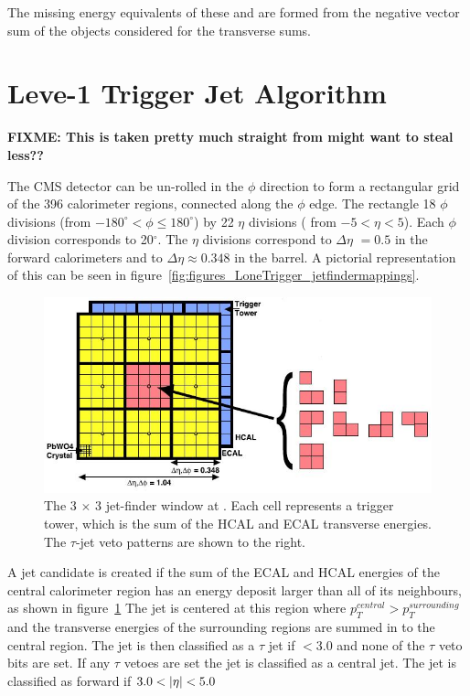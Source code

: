 The missing energy equivalents of these \MET and \MHT are formed from the 
negative vector sum of the objects considered for the
transverse sums.



\section{Leve-1 Trigger Jet Algorithm} %
\label{sec:leve_1_trigger_jet_algorithm}

\textbf{FIXME: This is taken pretty much straight from \cite{gctcomm} might 
want to steal less??} 

The CMS detector can be un-rolled in the $\phi$ direction to form a rectangular 
grid of the 396 calorimeter regions, connected along the $\phi$ edge. The
rectangle 18 $\phi$ divisions (from $-180^{\circ} < \phi \leq 180^{\circ}$) by 
22 $\eta$ divisions ( from $-5 < \eta < 5$). Each $\phi$ division corresponds 
to 20$^{\circ}$. The $\eta$ divisions correspond to $\Delta\eta$ $= 0.5$ in the 
forward calorimeters and to $\Delta\eta \approx 0.348$ in the barrel.
A pictorial representation of this can be seen in 
figure~\ref{fig:figures_LoneTrigger_jetfindermappings}.

\begin{figure}[ht]
  \centering
    \includegraphics[width=\textwidth]{figures/LoneTrigger/level1jetalgo.jpg}
  \caption{The 3 $\times$ 3 jet-finder window at \Lone. Each cell represents a 
  trigger tower, which is the sum of the HCAL and ECAL transverse energies. The 
  $\tau$-jet veto patterns are shown to the right.}
  \label{fig:figures_LoneTrigger_level1jetalgo}
\end{figure}


A jet candidate is created if the sum of the ECAL and HCAL energies of the 
central calorimeter region has an energy deposit larger than all of its 
neighbours, as shown in figure~\ref{fig:figures_LoneTrigger_level1jetalgo}
The jet is centered at this region where $p_{T}^{central} > p_{T}^{surrounding}$
and the transverse energies of the surrounding regions are summed in to the 
central region. The jet is then classified as a $\tau$ jet if \mETA $< 3.0$ and 
none of the $\tau$ veto bits are set. If any $\tau$ vetoes are set the jet is 
classified as a central jet. The jet is classified as forward if $ 3.0 < |\eta| 
< 5.0$

